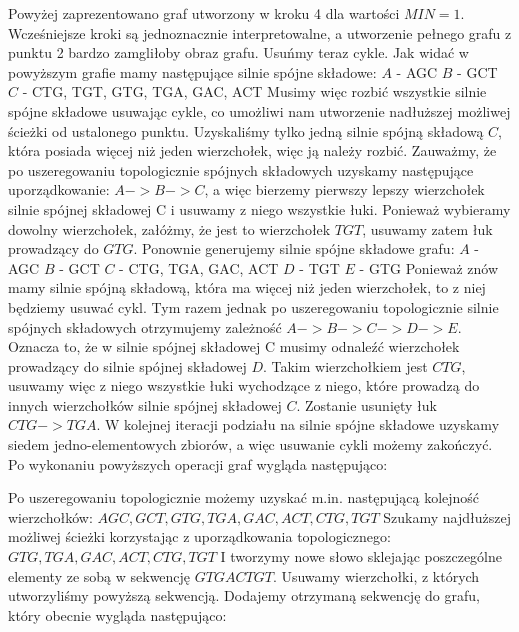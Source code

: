 \documentclass[a4paper,10pt]{article}
\begin{document}
Powyżej zaprezentowano graf utworzony w kroku 4 dla wartości $MIN=1$. Wcześniejsze kroki są jednoznacznie interpretowalne, a utworzenie pełnego grafu z punktu 2 bardzo zamgliłoby obraz grafu. Usuńmy teraz cykle.
Jak widać w powyższym grafie mamy następujące silnie spójne składowe:
$A$ - {AGC}
$B$ - {GCT}
$C$ - {CTG, TGT, GTG, TGA, GAC, ACT}
Musimy więc rozbić wszystkie silnie spójne składowe usuwając cykle, co umożliwi nam utworzenie nadłuższej możliwej ścieżki od ustalonego punktu.
Uzyskaliśmy tylko jedną silnie spójną składową $C$, która posiada więcej niż jeden wierzchołek, więc ją należy rozbić. Zauważmy, że po uszeregowaniu topologicznie spójnych składowych uzyskamy następujące uporządkowanie: $A->B->C$, a więc bierzemy pierwszy lepszy wierzchołek silnie spójnej składowej C i usuwamy z niego wszystkie łuki. Ponieważ wybieramy dowolny wierzchołek, załóżmy, że jest to wierzchołek $TGT$, usuwamy zatem łuk prowadzący do $GTG$.
Ponownie generujemy silnie spójne składowe grafu:
$A$ - {AGC}
$B$ - {GCT}
$C$ - {CTG, TGA, GAC, ACT}
$D$ - {TGT}
$E$ - {GTG}
Ponieważ znów mamy silnie spójną składową, która ma więcej niż jeden wierzchołek, to z niej będziemy usuwać cykl. Tym razem jednak po uszeregowaniu topologicznie silnie spójnych składowych otrzymujemy zależność $A->B->C->D->E$. Oznacza to, że w silnie spójnej składowej C musimy odnaleźć wierzchołek prowadzący do silnie spójnej składowej $D$. Takim wierzchołkiem jest $CTG$, usuwamy więc z niego wszystkie łuki wychodzące z niego, które prowadzą do innych wierzchołków silnie spójnej składowej $C$. Zostanie usunięty łuk $CTG->TGA$.
W kolejnej iteracji podziału na silnie spójne składowe uzyskamy siedem jedno-elementowych zbiorów, a więc usuwanie cykli możemy zakończyć. Po wykonaniu powyższych operacji graf wygląda następująco:


Po uszeregowaniu topologicznie możemy uzyskać m.in. następującą kolejność wierzchołków:
$AGC, GCT, GTG, TGA, GAC, ACT, CTG, TGT$
Szukamy najdłuższej możliwej ścieżki korzystając z uporządkowania topologicznego:
$GTG, TGA, GAC, ACT, CTG, TGT$
I tworzymy nowe słowo sklejając poszczególne elementy ze sobą w sekwencję $GTGACTGT$.
Usuwamy wierzchołki, z których utworzyliśmy powyższą sekwencją. Dodajemy otrzymaną sekwencję do grafu, który obecnie wygląda następująco:
\end{document}
